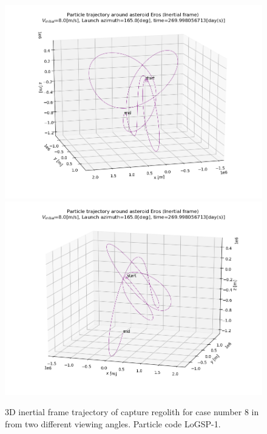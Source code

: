 \FloatBarrier
\begin{figure}[htb]
\centering
\captionsetup{justification=centering}
\includegraphics[scale=0.7]{longest_edge_perturbations/3.2Density_1cmSize/3dTrajectory_8ms_165Azimuth_45solarPhase_View1.png}
\includegraphics[scale=0.7]{longest_edge_perturbations/3.2Density_1cmSize/3dTrajectory_8ms_165Azimuth_45solarPhase_View2.png}
\caption{3D inertial frame trajectory of capture regolith for case number 8 in  from two different viewing angles. Particle code LoGSP-1.}
\label{fig:LoGSP_1_capture_case_8_3d_traj_inertialFrame_differnetViews}
\end{figure}
\FloatBarrier
